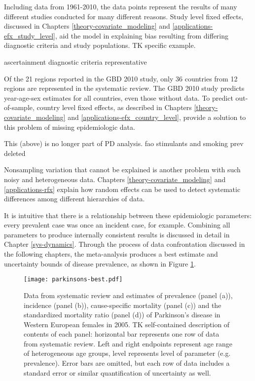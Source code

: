 Including data from 1961-2010, the data points represent the results of many different studies conducted for many different reasons.  Study level fixed effects, discussed in Chapters \ref{theory-covariate_modeling} and \ref{applications-efx_study_level}, aid the model in explaining bias resulting from differing diagnostic criteria and study populations. TK specific example.

ascertainment
diagnostic criteria
representative

Of the 21 regions reported in the GBD 2010 study, only 36 countries from 12 regions are represented in the systematic review.  The GBD 2010 study predicts year-age-sex estimates for all countries, even those without data.  To predict out-of-sample, country level fixed effects, as described in Chapters \ref{theory-covariate_modeling} and \ref{applications-efx_country_level}, provide a solution to this problem of missing epidemiologic data.

This (above) is no longer part of PD analysis.  fao stimulants and smoking prev deleted

Nonsampling variation that cannot be explained is another problem with such noisy and heterogeneous data.  Chapters \ref{theory-covariate_modeling} and \ref{applications-rfx} explain how random effects can be used to detect systematic differences among different hierarchies of data.

It is intuitive that there is a relationship between these epidemiologic parameters: every prevalent case was once an incident case, for example.  Combining all parameters to produce internally consistent results is discussed in detail in Chapter \ref{sys-dynamics}.  Through the process of data confrontation discussed in the following chapters, the meta-analysis produces a best estimate and uncertainty bounds of disease prevalence, as shown in Figure \ref{fig:intro-parkinsons fit}.

    \begin{figure}[h]
        \begin{center}
            \texttt{[image: parkinsons-best.pdf]}
            \caption{Data from systematic review and estimates of prevalence (panel (a)), incidence (panel (b)), cause-specific mortality (panel (c)) and the standardized mortality ratio (panel (d)) of Parkinson's disease in Western European females in 2005. TK self-contained description of contents of each panel: horizontal bar represents one row of data from systematic review.  Left and right endpoints represent age range of heterogeneous age groups, level represents level of parameter (e.g. prevalence).  Error bars are omitted, but each row of data includes a standard error or similar quantification of uncertainty as well.}
            \label{fig:intro-parkinsons fit}
        \end{center}
    \end{figure}
